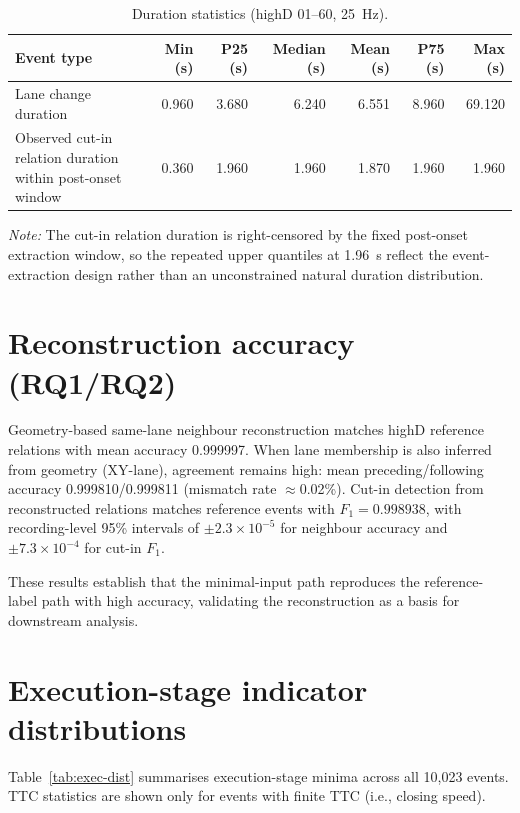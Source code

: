 \documentclass[12pt,a4paper,twoside,openright]{report}
\begin{document}
    \begin{table}[H]
        \centering
        \caption{Duration statistics (highD 01--60, \SI{25}{\hertz}).}
        \label{tab:duration-stats}
        {\small
        \setlength{\tabcolsep}{4pt}
            \begin{tabular}{@{}lrrrrrr@{}}
                \toprule
                Event type & Min (s) & P25 (s) & Median (s) & Mean (s) & P75 (s) & Max (s) \\
                \midrule
                Lane change duration & 0.960 & 3.680 & 6.240 & 6.551 & 8.960 & 69.120 \\
                \shortstack[l]{Observed cut-in relation duration\\within post-onset window} & 0.360 & 1.960 & 1.960 & 1.870 & 1.960 & 1.960 \\
                \bottomrule
            \end{tabular}}

    \vspace{2pt}
    {\footnotesize \emph{Note:} The cut-in relation duration is right-censored by the fixed post-onset extraction window, so the repeated upper quantiles at \SI{1.96}{\second} reflect the event-extraction design rather than an unconstrained natural duration distribution.}
    \end{table}

    \section{Reconstruction accuracy (RQ1/RQ2)}
    Geometry-based same-lane neighbour reconstruction matches highD reference relations with mean accuracy 0.999997. When lane membership is also inferred from geometry (XY-lane), agreement remains high: mean preceding/following accuracy 0.999810/0.999811 (mismatch rate $\approx$0.02\%). Cut-in detection from reconstructed relations matches reference events with $F_1 = 0.998938$, with recording-level 95\% intervals of $\pm 2.3\times10^{-5}$ for neighbour accuracy and $\pm 7.3\times10^{-4}$ for cut-in $F_1$.

    These results establish that the minimal-input path reproduces the reference-label path with high accuracy, validating the reconstruction as a basis for downstream analysis.

    \section{Execution-stage indicator distributions}
    Table~\ref{tab:exec-dist} summarises execution-stage minima across all 10,023 events. TTC statistics are shown only for events with finite TTC (i.e., closing speed).
\end{document}
